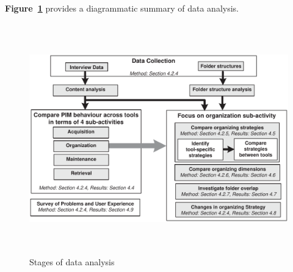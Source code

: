 \textbf{Figure~\ref{fig:exp-study:analysis-structure}} provides a diagrammatic summary of data analysis.

\begin{figure}[hbtp]
	\begin{center}
		\leavevmode
			\includegraphics[height=10cm]{pictures/exp-study/analysis-structure.pdf}
	\end{center}
	\caption{Stages of data analysis}
	\label{fig:exp-study:analysis-structure}
\end{figure}




